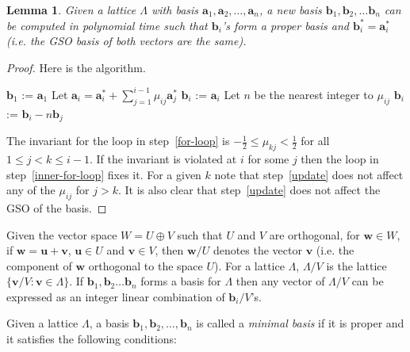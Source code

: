 \documentclass{article}
\newtheorem{lemma}[theorem]{Lemma}
\theoremstyle{definition}\newtheorem{remark}[theorem]{Remark}
\renewcommand{\vector}[1]{\ensuremath{\mathbf{#1}}}
\begin{document}
\begin{lemma}\label{proper-basis}
  Given a lattice $\Lambda$ with  basis $\vector{a}_1,\vector{a}_2,\ldots,
\vector{a}_n$, a new basis $\vector{b}_1,\vector{b}_2,\ldots\vector{b}_n$ can
be computed in polynomial time such that $\vector{b}_i$'s form a proper basis
and $\vector{b}_i^* = \vector{a}_i^*$ (i.e. the GSO basis of both vectors are
the same).
\end{lemma}
\begin{proof}
  Here is the algorithm.

  \begin{algorithm}
\vspace{-5mm}
    $\vector{b}_1$ := $\vector{a}_1$\;
    {
      Let $\vector{a}_i = \vector{a}_i^* +
      \sum_{j=1}^{i-1} \mu_{ij} \vector{a}_j^*$\;
      $\vector{b}_i$ := $\vector{a}_i$\;   
      {
        {
          Let $n$ be the nearest integer to $\mu_{ij}$\;
          $\vector{b}_i$ := $\vector{b}_i - n \vector{b}_j$\;
        }
      }
    }
  \end{algorithm}
  The invariant for the loop in step~\ref{for-loop} is $-\frac{1}{2}
  \leq \mu_{kj} < \frac{1}{2}$ for all $1 \leq j < k \leq i-1$. If the
  invariant is violated at $i$ for some $j$ then the loop in
  step~\ref{inner-for-loop} fixes it. For a given $k$ note that
  step~\ref{update} does not affect any of the $\mu_{ij}$ for $j > k$.
  It is also clear that step~\ref{update} does not affect the GSO of
  the basis.
\end{proof}
 
Given the vector space $W = U \oplus V$ such that $U$ and $V$ are
orthogonal, for $\vector{w} \in W$, if $\vector{w} = \vector{u} +
\vector{v}$, $\vector{u} \in U$ and $\vector{v} \in V$, then
$\vector{w}/U$ denotes the vector $\vector{v}$ (i.e. the component of
$\vector{w}$ orthogonal to the space $U$). For a lattice $\Lambda$,
$\Lambda/V$ is the lattice $\{ \vector{v}/V : \vector{v} \in \Lambda
\}$. If $\vector{b}_1,\vector{b}_2 \ldots \vector{b}_n$ forms a basis
for $\Lambda$ then any vector of $\Lambda/V$ can be expressed as an
integer linear combination of $\vector{b}_i/V$'s.

Given a lattice $\Lambda$, a basis $\vector{b}_1,
\vector{b}_2,\ldots,\vector{b}_n$ is called a \emph{minimal basis} if
it is proper and it satisfies the following conditions:
\end{document}

